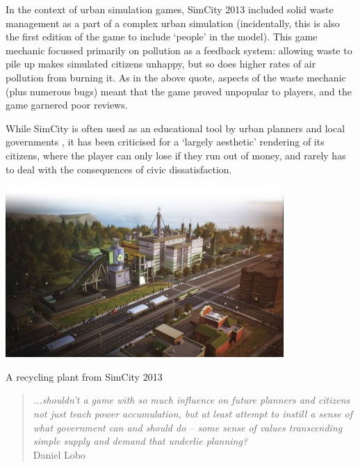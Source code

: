 \documentclass[nofonts,nols,justified,nobib]{tufte-book}
\begin{document}
In the context of urban simulation games, SimCity 2013 included solid waste management as a part of a complex urban simulation (incidentally, this is also the first edition of the game to include `people' in the model). This game mechanic focussed primarily on pollution as a feedback system: allowing waste to pile up makes simulated citizens unhappy, but so does higher rates of air pollution from burning it. As in the above quote, aspects of the waste mechanic (plus numerous bugs) meant that the game proved unpopular to players, and the game garnered poor reviews.  

While SimCity is often used as an educational tool by urban planners and local governments \cite{gaber_simulating_2007, lobo_city_2004}, it has been criticised for a `largely aesthetic' \cite{gaber_simulating_2007} rendering of its citizens, where the player can only lose if they run out of money, and rarely has to deal with the consequences of civic dissatisfaction. 


\begin{marginfigure}
\includegraphics[width=\textwidth]{img/1/simcity2013-recycling.jpeg}
\caption{A recycling plant from SimCity 2013 \cite{noauthor_garbage_2013}}
\end{marginfigure}


\begin{quote}
\emph{...shouldn’t a game with so much influence on future planners and citizens not just teach power accumulation, but at least attempt to instill a sense of what government can and should do -- some sense of values transcending simple supply and demand that underlie planning?} \cite{lobo_city_2004}\\
Daniel Lobo
\end{quote}
\end{document}
